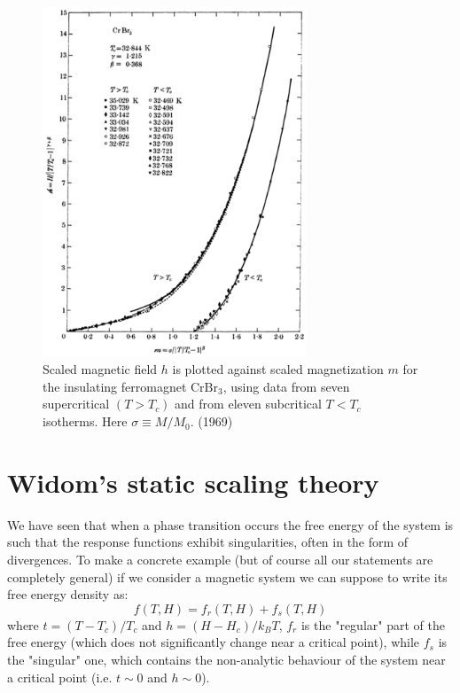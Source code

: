 \documentclass[../main/main.tex]{subfiles}
\begin{document}
 \begin{figure}[h!]
 \centering
 \includegraphics[width=0.7\textwidth]{../lessons/19_image/exp.jpg}
 \caption{\label{fig:19_2} Scaled magnetic field \( h \) is plotted against scaled magnetization \( m \) for the insulating ferromagnet \( \text{CrBr}_3 \), using data from seven supercritical \( (T>T_c) \) and from eleven subcritical \( T<T_c \) isotherms. Here \( \sigma \equiv M/M_0 \). (1969)}
 \end{figure}




\section{Widom's static scaling theory}
We have seen that when a phase transition occurs the free energy of the system is such that the response functions exhibit singularities, often in the form of divergences. To make a concrete example (but of course all our statements are completely general) if we consider a magnetic system we can suppose to write its free energy density as:
\begin{equation*}
  f(T,H) = f_r (T,H) + f_s (T,H)
\end{equation*}
where \( t = (T-T_c)/T_c \) and \( h = (H-H_c)/k_B T \), \( f_r \)  is the "regular" part of the free energy (which does not significantly change near a critical point), while \( f_s \) is the "singular" one, which contains the non-analytic behaviour of the system near a critical point (i.e. \( t \sim 0 \) and \( h \sim 0 \)).
\end{document}
